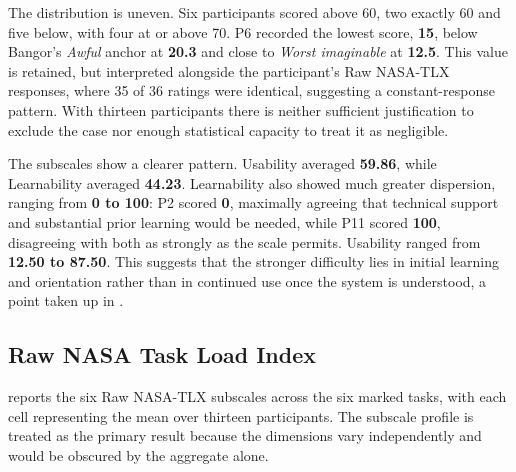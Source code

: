 The distribution is uneven. Six participants scored above 60, two exactly 60 and five below, with four at or above 70. P6 recorded the lowest score, \textbf{15}, below Bangor's \emph{Awful} anchor at \textbf{20.3} and close to \emph{Worst imaginable} at \textbf{12.5}. This value is retained, but interpreted alongside the participant's Raw \ac{NASA-TLX} responses, where 35 of 36 ratings were identical, suggesting a constant-response pattern. With thirteen participants there is neither sufficient justification to exclude the case nor enough statistical capacity to treat it as negligible.

The subscales show a clearer pattern. Usability averaged \textbf{59.86}, while Learnability averaged \textbf{44.23}. Learnability also showed much greater dispersion, ranging from \textbf{0 to 100}: P2 scored \textbf{0}, maximally agreeing that technical support and substantial prior learning would be needed, while P11 scored \textbf{100}, disagreeing with both as strongly as the scale permits. Usability ranged from \textbf{12.50 to 87.50}. This suggests that the stronger difficulty lies in initial learning and orientation rather than in continued use once the system is understood, a point taken up in .

\subsection{Raw NASA Task Load Index}
\label{sec:results_tlx}

 reports the six Raw \ac{NASA-TLX} subscales across the six marked tasks, with each cell representing the mean over thirteen participants. The subscale profile is treated as the primary result because the dimensions vary independently and would be obscured by the aggregate alone.

